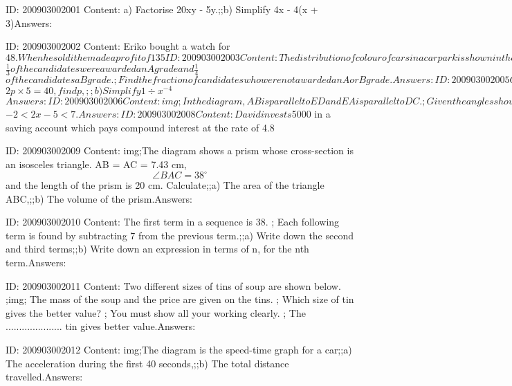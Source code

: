 \documentclass{article}
\begin{document}
ID: 200903002001
Content:
a) Factorise 20xy - 5y.;;b) Simplify 4x - 4(x + 3)Answers:

ID: 200903002002
Content:
Eriko bought a watch for $48. When he sold it he made a profit of 135%

ID: 200903002003
Content:
The distribution of colour of cars in a car park is shown in the table. ;img;;a) Write down the modal colour.;;b) This distribution is to be shown in a pie chart. Calculate the angle representing the colour green.Answers:

ID: 200903002004
Content:
a) In a test Jean gained 17 marks out of 24. ; Express this mark as a percentage.;;b) In an examination $$\frac{1}{3}$$ of the candidates were awarded an A grade and $$\frac{1}{4}$$ of the candidates a B grade. ; Find the fraction of candidates who were not awarded an A or B grade.Answers:

ID: 200903002005
Content:
a) Given that $$2p \times 5 = 40$$, find p,;;b) Simplify $$1 \div x^{-4}$$Answers:

ID: 200903002006
Content:
img;In the diagram, AB is parallel to ED and EA is parallel to DC. ; Given the angles shown, find;;a) x,;;b) y,Answers:

ID: 200903002007
Content:
Solve the inequalities $$-2 < 2x - 5 < 7$$.Answers:

ID: 200903002008
Content:
David invests $5000 in a saving account which pays compound interest at the rate of 4.8%

ID: 200903002009
Content:
img;The diagram shows a prism whose cross-section is an isosceles triangle. AB = AC = 7.43 cm, $$\angle BAC = 38^{\circ}$$ and the length of the prism is 20 cm. Calculate;;a) The area of the triangle ABC,;;b) The volume of the prism.Answers:

ID: 200903002010
Content:
The first term in a sequence is 38. ; Each following term is found by subtracting 7 from the previous term.;;a) Write down the second and third terms;;b) Write down an expression in terms of n, for the nth term.Answers:

ID: 200903002011
Content:
Two different sizes of tins of soup are shown below. ;img; The mass of the soup and the price are given on the tins. ; Which size of tin gives the better value? ; You must show all your working clearly. ; The ..................... tin gives better value.Answers:

ID: 200903002012
Content:
img;The diagram is the speed-time graph for a car;;a) The acceleration during the first 40 seconds,;;b) The total distance travelled.Answers:
\end{document}
